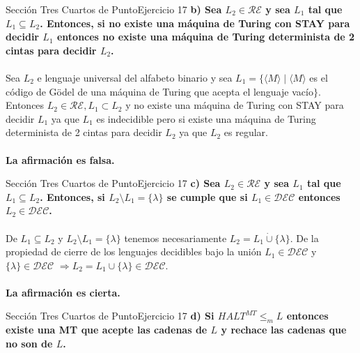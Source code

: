 \documentclass[10pt, envcountsect, presentation, aspectratio=169]{beamer}
\newcommand{\ld}{\ensuremath{\mathcal {DEC}}}
\newcommand{\lr}{\ensuremath{\mathcal {RE}}}
\begin{document}

\begin{frame}{Sección Tres Cuartos de Punto}{Ejercicio 17}
    \textbf{b) Sea $L_2 \in \lr$ y sea $L_1$ tal que $L_1 \subseteq L_2$. Entonces, si no  existe una máquina de Turing con  STAY para decidir $L_1$ entonces no existe una máquina de Turing determinista de 2 cintas para decidir $L_2$.}\\~\\

    Sea $L_2$ e lenguaje universal del alfabeto binario y sea $L_1=\{ \langle M \rangle \mid \langle M \rangle$ es el código de Gödel de una máquina de Turing que acepta el lenguaje vacío$\}$.
    Entonces $L_2 \in \mathcal{RE}, L_1 \subset L_2$ y no existe una máquina de Turing con STAY para decidir $L_1$ ya que $L_1$ es indecidible pero si existe una máquina de Turing determinista de 2 cintas para decidir $L_2$ ya que $L_2$ es regular.\\~\\

    \textbf{La afirmación es falsa.}
\end{frame}


\begin{frame}{Sección Tres Cuartos de Punto}{Ejercicio 17}
    \textbf{c) Sea $L_2 \in \lr$ y sea $L_1$ tal que $L_1 \subseteq L_2$. Entonces, si $L_2 \setminus L_1=\{\lambda\}$ se cumple que si $L_1 \in \ld$ entonces $L_2 \in \ld$.}\\~\\

    De $L_1 \subseteq L_2$ y $L_2 \setminus L_1 = \{\lambda\}$ tenemos necesariamente $L_2 = L_1 \dot{\cup} \{\lambda\}$.
    De la propiedad de cierre de los lenguajes decidibles bajo la unión $L_1 \in \mathcal{DEC}$ y $\{\lambda\} \in \mathcal{DEC}$ $\Rightarrow L_2 = L_1 \cup \{\lambda\} \in \mathcal{DEC}.$\\~\\

    \textbf{La afirmación es cierta.}

\end{frame}


\begin{frame}{Sección Tres Cuartos de Punto}{Ejercicio 17}
    \textbf{d) Si $HALT^{MT} \le_m L$ entonces existe una MT  que acepte las cadenas de $L$ y rechace las cadenas que no son de $L$.}\\~\\    
\end{frame}
\end{document}
